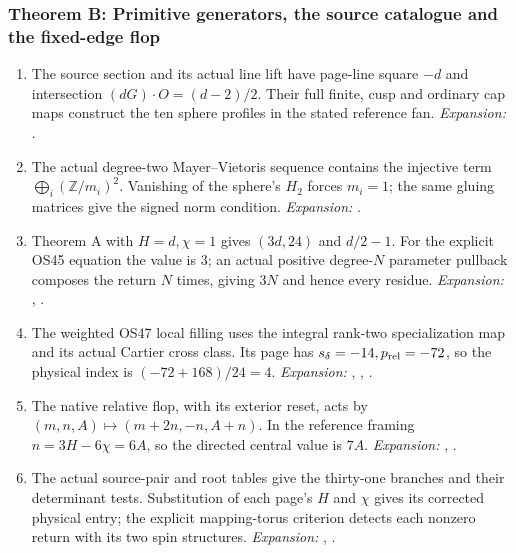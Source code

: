 \hypertarget{outline-IV-B}{}
\subsubsection*{Theorem B: Primitive generators, the source catalogue and the fixed-edge flop}
\begin{enumerate}[label=\arabic*.,leftmargin=*]

\item\hypertarget{step-IV-B-1}{} The source section and its actual line lift have page-line square
$-d$ and intersection $(dG)\cdot O=(d-2)/2$. Their full finite,
cusp and ordinary cap maps construct the ten sphere profiles in
the stated reference fan.
\textit{Expansion:} .

\item\hypertarget{step-IV-B-2}{} The actual degree-two Mayer--Vietoris sequence contains the
injective term $\bigoplus_i(\mathbb Z/m_i)^2$. Vanishing of the
sphere's $H_2$ forces $m_i=1$; the same gluing matrices give the
signed norm condition.
\textit{Expansion:} .

\item\hypertarget{step-IV-B-3}{} Theorem A with $H=d,\chi=1$ gives $(3d,24)$ and $d/2-1$.
For the explicit OS45 equation the value is $3$; an actual
positive degree-$N$ parameter pullback composes the return $N$ times,
giving $3N$ and hence every residue.
\textit{Expansion:} , .

\item\hypertarget{step-IV-B-4}{} The weighted OS47 local filling uses the integral rank-two
specialization map and its actual Cartier cross class. Its page has
$s_\delta=-14,p_{\rm rel}=-72$, so the physical index is
$(-72+168)/24=4$.
\textit{Expansion:} , , .

\item\hypertarget{step-IV-B-5}{} The native relative flop, with its exterior reset, acts by
$(m,n,A)\mapsto(m+2n,-n,A+n)$. In the reference framing
$n=3H-6\chi=6A$, so the directed central value is $7A$.
\textit{Expansion:} , .

\item\hypertarget{step-IV-B-6}{} The actual source-pair and root tables give the thirty-one
branches and their determinant tests. Substitution of each page's
$H$ and $\chi$ gives its corrected physical entry; the explicit
mapping-torus criterion detects each nonzero return with its two
spin structures.
\textit{Expansion:} , .

\end{enumerate}

